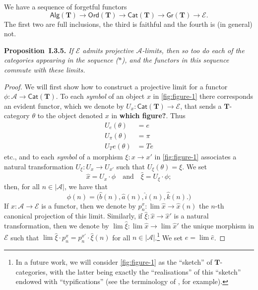 \documentclass{article}
\newenvironment{itenv}[1]
  {\phantomsection\par\medskip\noindent\textbf{#1.}\itshape}
  {\par\medskip}
\newcommand{\unsure}[1]{{\color{purple}\textbf{#1}}}
\newcommand{\TT}{\mathbf{T}}
\newcommand{\textand}{\quad\text{and}\quad}
\newcommand{\cat}[1]{\mathcal{#1}}
\newcommand{\Cat}[1]{\mathsf{#1}}
\newcommand{\set}[1]{|#1|}
\newcommand{\Gr}[1]{\Cat{Gr}(#1)}
\newcommand{\Alg}[1]{\Cat{Alg}(#1)}
\newcommand{\Ord}[1]{\Cat{Ord}(#1)}
\begin{document}
We have a sequence of forgetful functors
\[
  \Alg{\TT}
  \to \Ord{\TT}
  \to \Cat{Cat}(\TT)
  \to \Gr{\TT}
  \to \cat{E}.
  \tag{$\ast$}
\]
The first two are full inclusions, the third is faithful and the fourth is (in general) not.

\begin{itenv}{Proposition~I.3.5}
  If $\cat{E}$ admits projective $\cat{A}$-limits, then so too do each of the categories appearing in the sequence ($\ast$), and the functors in this sequence commute with these limits.
\end{itenv}

\begin{proof}
  We will first show how to construct a projective limit for a functor $\phi\colon\cat{A}\to\Cat{Cat}(\TT)$.
  To each \emph{symbol} of an object $x$ in \cref{fig:figure-1} there corresponds an evident functor, which we denote by $U_x\colon\Cat{Cat}(\TT)\to\cat{E}$, that sends a $\TT$-category $\theta$ to the object denoted $x$ in \unsure{which figure?}.
  Thus
  \[
    \begin{aligned}
      U_e(\theta)
      &= e
    \\U_\pi(\theta)
      &= \pi
    \\U_Te(\theta)
      &= Te
    \end{aligned}
  \]
  etc., and to each \emph{symbol} of a morphism $\xi\colon x\to x'$ in \cref{fig:figure-1} associates a natural transformation $U_\xi\colon U_x\to U_{x'}$ such that $U_\xi(\theta)=\xi$.
  We set
  \[
    \hat{x} = U_x\cdot\phi
    \textand
    \hat{\xi} = U_\xi\cdot\phi;
  \]
  then, for all $n\in\set{\cat{A}}$, we have that
  \[
    \phi(n)
    = \big(
      \hat{b}(n),
      \hat{a}(n),
      \hat{i}(n),
      \hat{k}(n).
    \big)
  \]
  If $\hat{x}\colon\cat{A}\to\cat{E}$ is a functor, then we denote by $p_n^x\colon\lim\hat{x}\to\hat{x}(n)$ the $n$-th canonical projection of this limit.
  Similarly, if $\hat{\xi}\colon\hat{x}\to\hat{x}'$ is a natural transformation, then we denote by $\lim\hat{\xi}\colon\lim\hat{x}\to\lim\hat{x}'$ the unique morphism in $\cat{E}$ such that $\lim\hat{\xi}\cdot p_n^x=p_n^{x'}\cdot\hat{\xi}(n)$ for all $n\in\set{\cat{A}}$.\footnote{In a future work, we will consider \cref{fig:figure-1} as the ``sketch'' of $\TT$-categories, with the latter being exactly the ``realisations'' of this ``sketch'' endowed with ``typifications'' (see the terminology of \cite{Bu}, for example).}
  We set $e=\lim\hat{e}$.


\end{proof}
\end{document}
